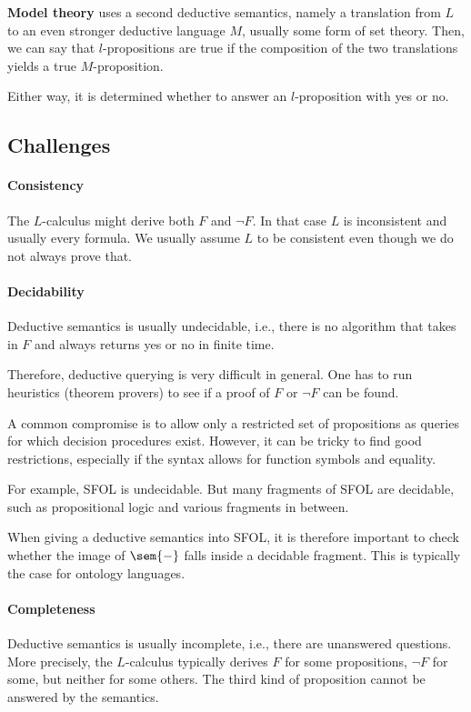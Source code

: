 \textbf{Model theory} uses a second deductive semantics, namely a translation from $L$ to an even stronger deductive language $M$, usually some form of set theory.
Then, we can say that $l$-propositions are true if the composition of the two translations yields a true $M$-proposition.

Either way, it is determined whether to answer an $l$-proposition with yes or no.

\subsection{Challenges}

\paragraph{Consistency}
The $L$-calculus might derive both $F$ and $\neg F$.
In that case $L$ is inconsistent and usually every formula.
We usually assume $L$ to be consistent even though we do not always prove that.

\paragraph{Decidability}
Deductive semantics is usually undecidable, i.e., there is no algorithm that takes in $F$
and always returns yes or no in finite time. 

Therefore, deductive querying is very difficult in general.
One has to run heuristics (theorem provers) to see if a proof of $F$ or $\neg F$ can be found.

A common compromise is to allow only a restricted set of propositions as queries for which decision procedures exist.
However, it can be tricky to find good restrictions, especially if the syntax allows for function symbols and equality.

For example, SFOL is undecidable.
But many fragments of SFOL are decidable, such as propositional logic and various fragments in between.

When giving a deductive semantics into SFOL, it is therefore important to check whether the image of $\sem{-}$ falls inside a decidable fragment.
This is typically the case for ontology languages.

\paragraph{Completeness}
Deductive semantics is usually incomplete, i.e., there are unanswered questions.
More precisely, the $L$-calculus typically derives $F$ for some propositions, $\neg F$ for some, but neither for some others.
The third kind of proposition cannot be answered by the semantics.

